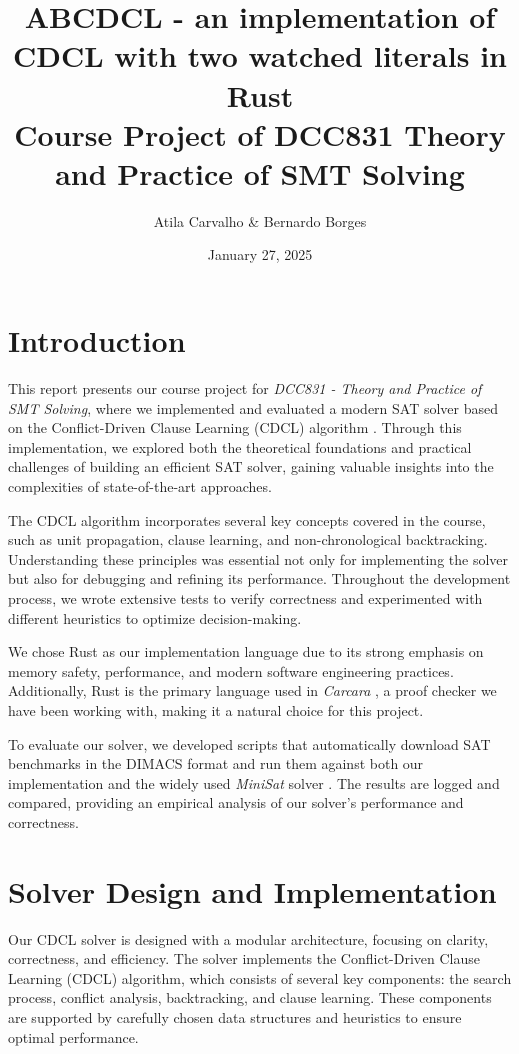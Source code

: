 \documentclass[a4paper,12pt]{article}
\title{ABCDCL - an implementation of CDCL with two watched literals in Rust\\
{\footnotesize Course Project of DCC831 Theory and Practice of SMT Solving}
}
\author{Atila Carvalho \& Bernardo Borges}
\date{January 27, 2025}
\begin{document}
\maketitle

\tableofcontents
\newpage

\section{Introduction}
\label{sec:introduction}

This report presents our course project for \textit{DCC831 - Theory and Practice of SMT Solving},
where we implemented and evaluated a modern SAT solver based on the Conflict-Driven Clause Learning
(CDCL) algorithm \cite{CdclAlgorithm}. Through this implementation, we explored both the theoretical
foundations and practical challenges of building an efficient SAT solver, gaining valuable insights
into the complexities of state-of-the-art approaches.

The CDCL algorithm incorporates several key concepts covered in the course, such as unit propagation,
clause learning, and non-chronological backtracking. Understanding these principles was essential not
only for implementing the solver but also for debugging and refining its performance. Throughout the
development process, we wrote extensive tests to verify correctness and experimented with different
heuristics to optimize decision-making.

We chose Rust \cite{RustLang} as our implementation language due to its strong emphasis on memory
safety, performance, and modern software engineering practices. Additionally, Rust is the primary
language used in \textit{Carcara} \cite{Carcara}, a proof checker we have been working with, making
it a natural choice for this project.

To evaluate our solver, we developed scripts that automatically download SAT benchmarks \cite{SatBenchmarks}
in the DIMACS format and run them against both our implementation and the widely used \textit{MiniSat}
solver \cite{Minisat}. The results are logged and compared, providing an empirical analysis of our
solver's performance and correctness.

\section{Solver Design and Implementation}
\label{sec:design}

Our CDCL solver is designed with a modular architecture, focusing on clarity, correctness, and efficiency. The solver implements the Conflict-Driven Clause Learning (CDCL) algorithm, which consists of several key components: the search process, conflict analysis, backtracking, and clause learning. These components are supported by carefully chosen data structures and heuristics to ensure optimal performance.
\end{document}
